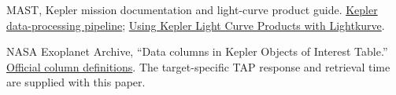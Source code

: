 \documentclass[
  english,
]{article}
\begin{document}
MAST, Kepler mission documentation and light-curve product guide.
\href{https://keplergo.github.io/KeplerScienceWebsite/pipeline.html}{Kepler
data-processing pipeline};
\href{https://spacetelescope.github.io/mast_notebooks/notebooks/Kepler/lightkurve_analyzing_lc_products/lightkurve_analyzing_lc_products.html}{Using
Kepler Light Curve Products with Lightkurve}.

NASA Exoplanet Archive, ``Data columns in Kepler Objects of Interest
Table.''
\href{https://exoplanetarchive.ipac.caltech.edu/docs/API_kepcandidate_columns.html}{Official
column definitions}. The target-specific TAP response and retrieval time
are supplied with this paper.
\end{document}
